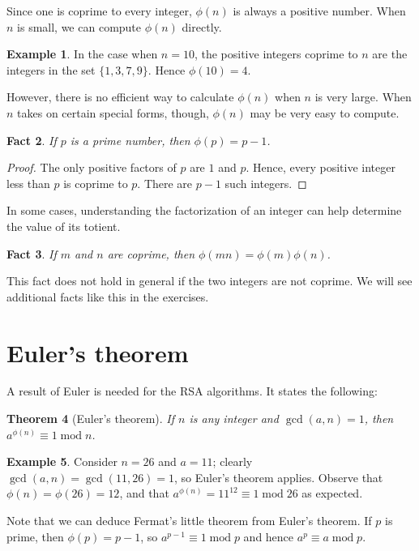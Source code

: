 \documentclass{book}
\theoremstyle{plain}
\newtheorem{theorem}{Theorem}[chapter]
\newtheorem{fact}[theorem]{Fact}
\theoremstyle{definition}
\newtheorem{example}[theorem]{Example}
\renewcommand{\mod}{\operatorname{mod}}
\renewcommand{\mod}{\operatorname{mod}}
\begin{document}
Since one is coprime to every integer, $\phi(n)$ is always a positive number. When $n$ is small, we can compute $\phi(n)$ directly.

\begin{example}
In the case when $n = 10$, the positive integers coprime to $n$ are the integers in the set $\{1,3,7,9\}$. Hence $\phi(10) = 4$.
\end{example}

However, there is no efficient way to calculate $\phi(n)$ when $n$ is very large. When $n$ takes on certain special forms, though, $\phi(n)$ may be very easy to compute.

\begin{fact}
If $p$ is a prime number, then $\phi(p) = p-1$.
\end{fact}

\begin{proof}
The only positive factors of $p$ are $1$ and $p$. Hence, every positive integer less than $p$ is coprime to $p$. There are $p-1$ such integers.
\end{proof}

In some cases, understanding the factorization of an integer can help determine the value of its totient.

\begin{fact}
If $m$ and $n$ are coprime, then $\phi(mn) = \phi(m)\phi(n)$.
\end{fact}

This fact does not hold in general if the two integers are not coprime. We will see additional facts like this in the exercises.

\section{Euler's theorem}
A result of Euler is needed for the RSA algorithms. It states the following:

\begin{theorem}[Euler's theorem]
If $n$ is any integer and $\gcd(a,n) = 1$, then $a^{\phi(n)} \equiv 1 \mod n$.
\end{theorem}

\begin{example}
Consider $n = 26$ and $a = 11$; clearly $\gcd(a,n) = \gcd(11,26) = 1$, so Euler's theorem applies. Observe that $\phi(n) = \phi(26) = 12$, and that $a^{\phi(n)} = 11^{12} \equiv 1 \mod 26$ as expected.
\end{example}

Note that we can deduce Fermat's little theorem from Euler's theorem. If $p$ is prime, then $\phi(p) = p-1$, so $a^{p-1} \equiv 1 \mod p$ and hence $a^p \equiv a \mod p$.
\end{document}

